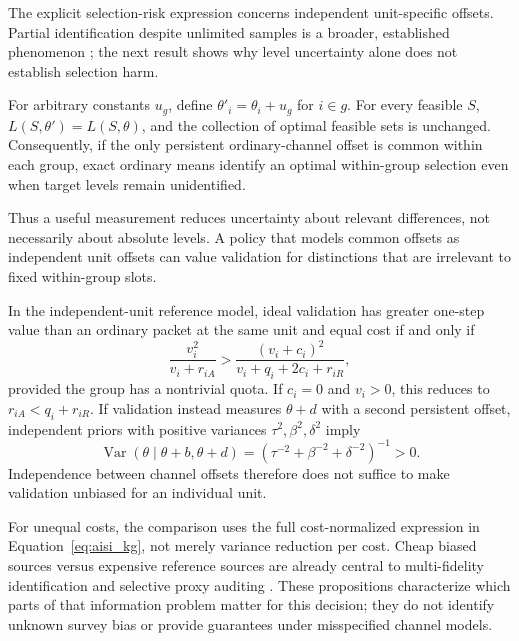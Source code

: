 The explicit selection-risk expression concerns independent unit-specific
offsets. Partial identification despite unlimited samples is a broader,
established phenomenon \citep{altschuler2019contaminated}; the next result
shows why level uncertainty alone does not establish selection harm.

\begin{proposition}
\label{prop:aisi_shared}
For arbitrary constants $u_g$, define $\theta'_i=\theta_i+u_g$ for $i\in g$.
For every feasible $S$, $L(S,\theta')=L(S,\theta)$, and the collection of
optimal feasible sets is unchanged. Consequently, if the only persistent
ordinary-channel offset is common within each group, exact ordinary means
identify an optimal within-group selection even when target levels remain
unidentified.
\end{proposition}

Thus a useful measurement reduces uncertainty about relevant differences,
not necessarily about absolute levels. A policy that models common offsets
as independent unit offsets can value validation for distinctions that are
irrelevant to fixed within-group slots.

\begin{proposition}
\label{prop:aisi_channel}
In the independent-unit reference model, ideal validation has greater
one-step value than an ordinary packet at the same unit and equal cost
if and only if
\begin{equation}
 \frac{v_i^2}{v_i+r_{iA}}>
 \frac{(v_i+c_i)^2}{v_i+q_i+2c_i+r_{iR}},
 \label{eq:aisi_switch}
\end{equation}
provided the group has a nontrivial quota. If $c_i=0$ and $v_i>0$, this
reduces to $r_{iA}<q_i+r_{iR}$. If validation instead measures
$\theta+d$ with a second persistent offset, independent priors with positive
variances $\tau^2,\beta^2,\delta^2$ imply
\begin{equation}
 \operatorname{Var}(\theta\mid\theta+b,\theta+d)
  =(\tau^{-2}+\beta^{-2}+\delta^{-2})^{-1}>0.
 \label{eq:aisi_two_biased}
\end{equation}
Independence between channel offsets therefore does not suffice to make
validation unbiased for an individual unit.
\end{proposition}

For unequal costs, the comparison uses the full cost-normalized expression
in Equation~\eqref{eq:aisi_kg}, not merely variance reduction per cost.
Cheap biased sources versus expensive reference sources are already central
to multi-fidelity identification \citep{poiani2024optimal} and selective
proxy auditing \citep{ao2026judges}. These propositions characterize which
parts of that information problem matter for this decision; they do not
identify unknown survey bias or provide guarantees under misspecified
channel models.
